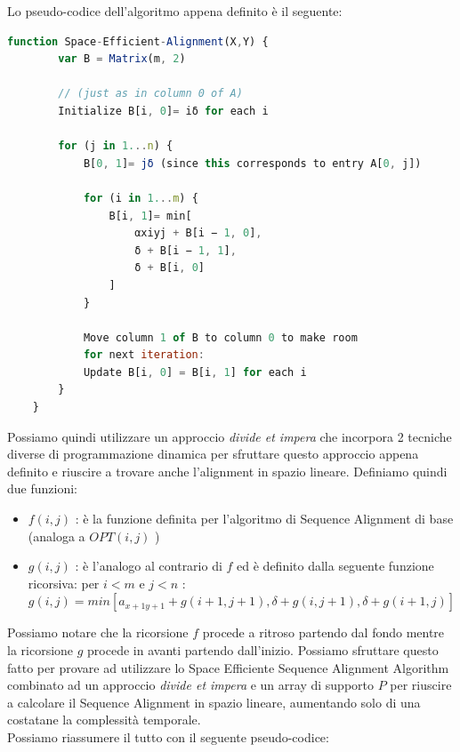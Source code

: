 Lo pseudo-codice dell'algoritmo appena definito è il seguente:

\begin{lstlisting}[language=JavaScript]
    function Space-Efficient-Alignment(X,Y) {
        var B = Matrix(m, 2)

        // (just as in column 0 of A)
        Initialize B[i, 0]= iδ for each i 

        for (j in 1...n) {
            B[0, 1]= jδ (since this corresponds to entry A[0, j])

            for (i in 1...m) {
                B[i, 1]= min[
                    αxiyj + B[i − 1, 0],
                    δ + B[i − 1, 1], 
                    δ + B[i, 0]
                ]
            }

            Move column 1 of B to column 0 to make room 
            for next iteration:
            Update B[i, 0] = B[i, 1] for each i
        }
    }
\end{lstlisting}

Possiamo quindi utilizzare un approccio \textit{divide et impera} che incorpora 2
tecniche diverse di programmazione dinamica per sfruttare questo approccio
appena definito e riuscire a trovare anche l'alignment in spazio lineare.
Definiamo quindi due funzioni:

\begin{itemize}
    \item $f(i, j)$ : è la funzione definita per l'algoritmo di Sequence
          Alignment di base (analoga a $OPT(i,j)$ )
    \item $g(i, j)$ : è l'analogo al contrario di $f$ ed è definito dalla
          seguente funzione ricorsiva: per $i < m$ e $j < n$ : $g(i,j) =
              min[a_{x+1y+1} + g(i+1, j+1), \delta + g(i, j+1), \delta + g(i+1, j)]$
\end{itemize}

Possiamo notare che la ricorsione $f$ procede a ritroso partendo dal fondo
mentre la ricorsione $g$ procede in avanti partendo dall'inizio. Possiamo
sfruttare questo fatto per provare ad utilizzare lo Space Efficiente Sequence
Alignment Algorithm combinato ad un approccio \textit{divide et impera} e un array di
supporto $P$ per riuscire a calcolare il Sequence Alignment in spazio lineare,
aumentando solo di una costatane la complessità temporale.\\

Possiamo riassumere il tutto con il seguente pseudo-codice:

